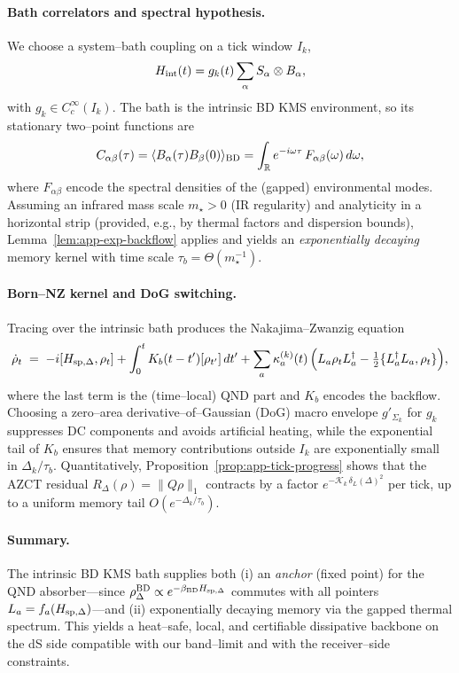 \documentclass[10pt]{article}
\theoremstyle{definition}
\theoremstyle{plain}
\begin{document}
\paragraph{Bath correlators and spectral hypothesis.}\label{par:uom-main-220}
We choose a system–bath coupling on a tick window \(I_k\),
\[
H_{\rm int}(t)=g_k(t)\sum_\alpha S_\alpha\otimes B_\alpha,
\]
with \(g_k\in C_c^\infty(I_k)\).
The bath is the intrinsic BD KMS environment, so its stationary two–point functions are
\[
C_{\alpha\beta}(\tau)=\langle B_\alpha(\tau)B_\beta(0)\rangle_{\rm BD}
=\int_{\mathbb R}e^{-i\omega\tau}\,F_{\alpha\beta}(\omega)\,d\omega,
\]
where \(F_{\alpha\beta}\) encode the spectral densities of the (gapped) environmental modes.
Assuming an infrared mass scale \(m_\star>0\) (IR regularity) and analyticity in a horizontal strip (provided, e.g., by thermal factors and dispersion bounds), Lemma~\ref{lem:app-exp-backflow} applies and yields an \emph{exponentially decaying} memory kernel with time scale \(\tau_b=\Theta(m_\star^{-1})\).

\paragraph{Born–NZ kernel and DoG switching.}\label{par:uom-main-221}
Tracing over the intrinsic bath produces the Nakajima–Zwanzig equation
\[
\dot\rho_t \;=\; -i[H_{{\rm sp},\Delta},\rho_t]
+\int_0^t K_b(t-t')[\rho_{t'}]\,dt'
+\sum_a \kappa_a^{(k)}(t)\,\Big(L_a\rho_t L_a^\dagger-\tfrac12\{L_a^\dagger L_a,\rho_t\}\Big),
\]
where the last term is the (time–local) QND part and \(K_b\) encodes the backflow.
Choosing a zero–area derivative–of–Gaussian (DoG) macro envelope \(g'_{\Sigma_k}\) for \(g_k\) suppresses DC components and avoids artificial heating, while the exponential tail of \(K_b\) ensures that memory contributions outside \(I_k\) are exponentially small in \(\Delta_k/\tau_b\).
Quantitatively, Proposition~\ref{prop:app-tick-progress} shows that the AZCT residual \(R_\Delta(\rho)=\|Q\rho\|_1\) contracts by a factor \(e^{-\mathcal K_k\,\delta_L(\Delta)^2}\) per tick, up to a uniform memory tail \(O(e^{-\Delta_k/\tau_b})\).

\paragraph{Summary.}\label{par:uom-main-222}
The intrinsic BD KMS bath supplies both (i) an \emph{anchor} (fixed point) for the QND absorber—since \(\rho_\Delta^{\rm BD}\propto e^{-\beta_{\rm BD}H_{{\rm sp},\Delta}}\) commutes with all pointers \(L_a=f_a(H_{{\rm sp},\Delta})\)—and (ii) exponentially decaying memory via the gapped thermal spectrum.
This yields a heat–safe, local, and certifiable dissipative backbone on the dS side compatible with our band–limit and with the receiver–side constraints.
\end{document}
